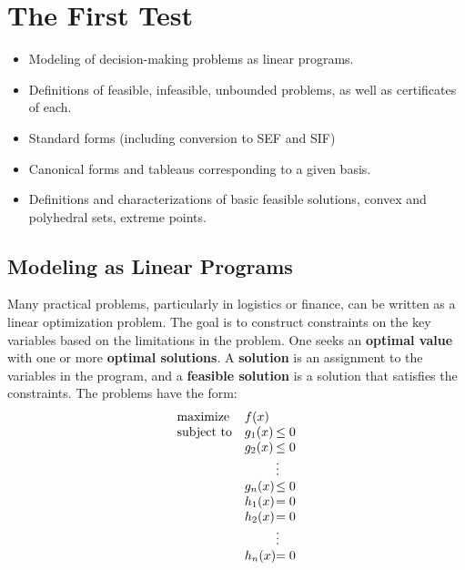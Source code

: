 \chapter{The First Test}

\begin{itemize}
    \item Modeling of decision-making problems as linear programs. \\
    \item Definitions of feasible, infeasible, unbounded problems, as well as
certificates of each.\\
    \item Standard forms (including conversion to SEF and SIF)\\
    \item Canonical forms and tableaus corresponding to a given basis.\\
    \item Definitions and characterizations of basic feasible solutions, convex
and polyhedral sets, extreme points.\\
\end{itemize}



\section{Modeling as Linear Programs}
Many practical problems, particularly in logistics or finance, can be written as a linear optimization problem. The goal is to construct constraints on the key variables based on the limitations in the problem. One seeks an \textbf{optimal value} with one or more \textbf{optimal solutions}. A \textbf{solution} is an assignment to the variables in the program, and a \textbf{feasible solution} is a solution that satisfies the constraints. The problems have the form:
\begin{equation*}
\begin{array}{ll@{}ll}
\text{maximize}  & f(x) &\\
\text{subject to}& g_1(x) & \leq 0 \\
                 & g_2(x) & \leq 0 \\ 
                 &        & \vdots \\
                 & g_n(x) & \leq 0 \\
                 & h_1(x) & = 0 \\
                 & h_2(x) & = 0 \\
                 &        & \vdots \\
                 & h_n(x) & = 0 \\
\end{array}
\end{equation*}


